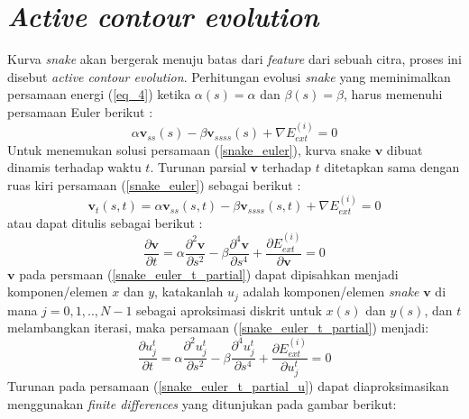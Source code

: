 \section{\emph{Active contour evolution}}
Kurva \emph{snake} akan bergerak menuju batas dari \emph{feature} dari sebuah citra, proses ini disebut \emph{active contour evolution}. Perhitungan evolusi \emph{snake} yang meminimalkan persamaan energi (\ref{eq_4}) ketika $\alpha(s) = \alpha$ dan $\beta(s) = \beta$, harus memenuhi persamaan Euler berikut \citep{xu1998snakes:22}:
\begin{equation}
	\label{snake_euler}
	\alpha\textbf{v}_{ss}(s) - \beta\textbf{v}_{ssss}(s) + \nabla E^{(i)}_{ext}  = 0
\end{equation}
Untuk menemukan solusi persamaan (\ref{snake_euler}), kurva snake $\textbf{v}$ dibuat dinamis terhadap waktu $t$. Turunan parsial $\textbf{v}$ terhadap $t$ ditetapkan sama dengan ruas kiri persamaan (\ref{snake_euler}) sebagai berikut \citep{xu1998snakes:22}:
\begin{equation}
	\label{snake_euler_t}
	\textbf{v}_{t}(s,t) = \alpha\textbf{v}_{ss}(s,t) - \beta\textbf{v}_{ssss}(s,t) + \nabla E^{(i)}_{ext}  = 0
\end{equation}
atau dapat ditulis sebagai berikut \citep{ivins1995everything}:
\begin{equation}
	\label{snake_euler_t_partial}
	\frac{\partial\textbf{v}}{\partial t} = \alpha \frac{\partial^2 \textbf{v}}{\partial s^2} - \beta \frac{\partial^4 \textbf{v}}{\partial s^4} + \frac{\partial E^{(i)}_{ext} }{ \partial \textbf{v}} = 0
\end{equation}
$\textbf{v}$ pada persmaan (\ref{snake_euler_t_partial}) dapat dipisahkan menjadi komponen/elemen $x$ dan $y$, katakanlah $u_{j}$ adalah komponen/elemen \emph{snake} $\textbf{v}$ di mana $j = 0,1,.., N-1$ sebagai aproksimasi diskrit untuk $x(s)$ dan $y(s)$, dan $t$ melambangkan iterasi, maka persamaan (\ref{snake_euler_t_partial}) menjadi:
\begin{equation}
	\label{snake_euler_t_partial_u}
	\frac{\partial u^{t}_{j} }{\partial t} = \alpha \frac{\partial^2 u^{t}_{j}}{\partial s^2} - \beta \frac{\partial^4 u^{t}_{j}}{\partial s^4} + \frac{\partial E^{(i)}_{ext} }{ \partial u^{t}_{j}} = 0
\end{equation}
Turunan pada persamaan (\ref{snake_euler_t_partial_u}) dapat diaproksimasikan menggunakan \emph{finite differences} yang ditunjukan pada gambar berikut:
